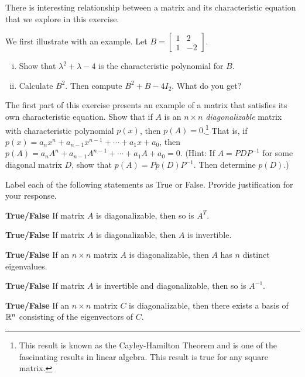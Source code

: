\item \label{ex:Cayley-Hamilton} There is interesting relationship between a matrix and its characteristic equation that we explore in this exercise.  
	\ba
	\item We first illustrate with an example. Let $B = \left[ \begin{array}{cr} 1&2\\ 1&-2 \end{array} \right]$.
		\begin{enumerate}[i.]
		\item Show that $\lambda^2 + \lambda - 4$ is the characteristic polynomial for $B$.
		\item Calculate $B^2$. Then compute $B^2 + B - 4I_2$. What do you get?
		\end{enumerate}
	\item The first part of this exercise presents an example of a matrix that satisfies its own characteristic equation. Show that if $A$ is an $n \times n$ \emph{diagonalizable} matrix with characteristic polynomial $p(x)$, then $p(A) = 0$.\footnote{This result is known as the Cayley-Hamilton Theorem and is one of the fascinating results in linear algebra. This result is true for any square matrix.} That is, if $p(x) = a_nx^n+a_{n-1}x^{n-1} + \cdots + a_1x + a_0$, then $p(A) = a_nA^n+a_{n-1}A^{n-1} + \cdots + a_1A + a_0 = 0$. (Hint: If $A = PDP^{-1}$ for some diagonal matrix $D$, show that $p(A) = Pp(D)P^{-1}$. Then determine $p(D)$.)
	\ea

\item Label each of the following statements as True or False. Provide justification for your response.
\ba
\item \textbf{True/False} If matrix $A$ is diagonalizable, then so is $A^T$.

\item \textbf{True/False} If matrix $A$ is diagonalizable, then $A$ is invertible.

\item \textbf{True/False} If an $n\times n$ matrix $A$ is diagonalizable, then $A$ has $n$ distinct eigenvalues.

\item \textbf{True/False} If matrix $A$ is invertible and diagonalizable, then so is $A^{-1}$.

\item \textbf{True/False} If an $n \times n$ matrix $C$ is diagonalizable, then there exists a basis of $\mathbb{R}^n$ consisting of the eigenvectors of $C$.

